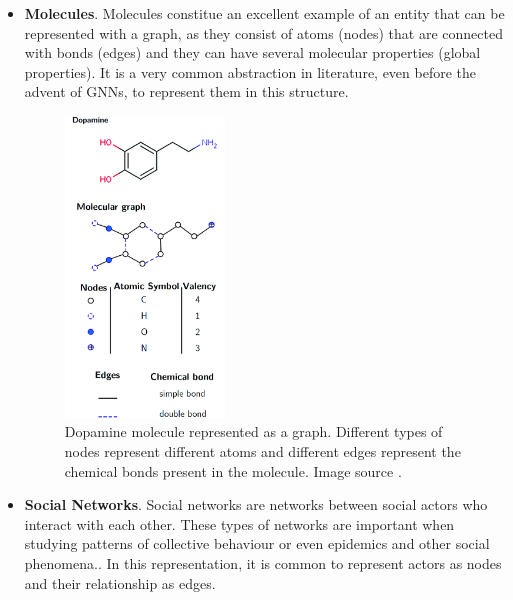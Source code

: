 \begin{itemize}
\item
  \textbf{Molecules}. Molecules constitue an excellent example
  of an entity that can be represented with a graph, as they consist of
  atoms (nodes) that are connected with bonds (edges) and they can
  have several molecular properties (global properties). It is a
  very common abstraction in literature, even before the advent of
  GNNs, to represent them in this structure\cite{article:duvenaud}.
  \begin{figure}
    \centering
    \includegraphics[width=0.4\textwidth]{Figures/chap_gnn/dopamine.png}
    \caption{Dopamine molecule represented as a graph. Different types of nodes represent different atoms and different edges represent the chemical bonds present in the molecule. Image source \citet{article:stefi}.}
    \label{fig:dopamine}
  \end{figure}
\item
  \textbf{Social Networks}. Social networks are networks between
    social actors who interact with each other. These types of networks
    are important when studying patterns of collective behaviour or even
    epidemics and other social phenomena.. In this
    representation, it is common to represent actors as nodes and their
    relationship as edges.
  
\end{itemize}


